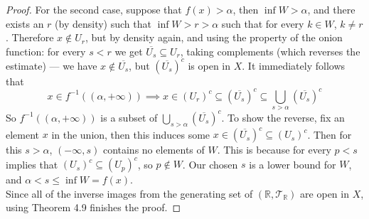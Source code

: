 \documentclass[../../main.tex]{subfiles}
\begin{document}
\begin{proof}
For the second case, suppose that $f(x)>\alpha$, then $\inf W>\alpha$, and there exists an $r$ (by density) such that $\inf W>r>\alpha$ such that for every $k\in W$, $k\neq r$. Therefore $x\notin U_r$, but by density again, and using the property of the onion function: for every $s<r$ we get $\overline{U_s}\subseteq U_r$, taking complements (which reverses the estimate) — we have $x\notin \overline{U_s}$, but $\left(\overline{U_s}\right)^c$ is open in $X$. It immediately follows that
\[
x\in f^{-1}((\alpha,+\infty))\implies x\in (U_r)^c\subseteq \left(\overline{U_s}\right)^c\subseteq\bigcup_{s>\alpha}\left(\overline{U_s}\right)^c
\]
So $f^{-1}((\alpha,+\infty))$ is a subset of $\bigcup_{s>\alpha}\left(\overline{U_s}\right)^c$. To show the reverse, fix an element $x$ in the union, then this induces some $x\in \left(\overline{U_s}\right)^c\subseteq (U_s)^c$. Then for this $s>\alpha$, $(-\infty,s)$ contains no elements of $W$. This is because for every $p<s$ implies that $(U_s)^c\subseteq(U_p)^c$, so $p\notin W$. Our chosen $s$ is a lower bound for $W$, and $\alpha<s\leq\inf W =f(x)$.\\

Since all of the inverse images from the generating set of $(\mathbb{R},\mathcal{T}_{\mathbb{R}})$ are open in $X$, using Theorem 4.9 finishes the proof.
\end{proof}
\end{document}
